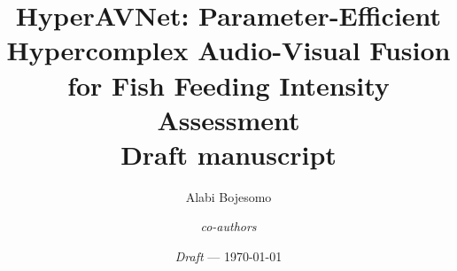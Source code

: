 %     
%     
\documentclass[10pt,twocolumn]{article}
\usepackage[a4paper,margin=18mm,columnsep=6mm]{geometry}
\usepackage[T1]{fontenc}
\usepackage{lmodern,microtype}
\usepackage{amsmath,amssymb,bm}
\usepackage{graphicx,booktabs,xcolor}
\usepackage[numbers,sort&compress]{natbib}
\usepackage[hidelinks]{hyperref}
\usepackage{cleveref}
\usepackage{caption}
\captionsetup{font=small,labelfont=bf}

\newif\ifshowtodos \showtodostrue
\newcommand{\todo}[1]{\ifshowtodos{\color{orange!80!black}\textsf{\small[#1]}}\fi}


\title{HyperAVNet: Parameter-Efficient Hypercomplex Audio-Visual Fusion\\for Fish Feeding Intensity Assessment\\[4pt]
\large Draft manuscript}
\author{Alabi Bojesomo \and \textit{co-authors}}
\date{\textit{Draft} --- \today}


\maketitle

\begin{abstract}

\end{abstract}











